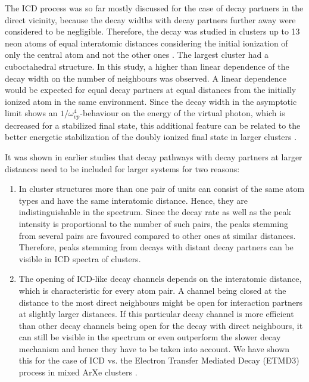 The ICD process was so far mostly discussed for the case of decay partners in
the direct vicinity, because the decay widths with decay partners further away
were considered to be negligible. Therefore, the decay was studied in clusters
up to 13 neon atoms of equal interatomic distances considering the initial
ionization of only the central
atom and not the other ones \cite{Santra01_3}. The largest cluster had
a cuboctahedral structure. In this study, a higher than
linear dependence of the decay width on the number of neighbours was
observed. A linear dependence would be expected for equal decay partners
at equal distances from the initially ionized atom in the same environment.
Since the decay width in the asymptotic limit shows an 
$1/\omega^{4}_{vp}$-behaviour on the energy of the virtual photon, which
is decreased for a stabilized final state, this additional feature
can be related to
the better energetic stabilization of the doubly ionized
final state in larger clusters \cite{Fasshauer13}.

It was shown in earlier studies \cite{Fasshauer13,Fasshauer14_1,Fasshauer16_1}
that decay pathways with decay partners at larger distances need to
be included for larger systems for two reasons:
\begin{enumerate}
 \item In cluster structures more than one pair of units can consist of
       the same atom types and have the same interatomic distance. Hence,
       they are indistinguishable in the spectrum. Since the decay rate
       as well as the peak intensity
       is proportional to the number of such pairs,
       the peaks stemming from several pairs are favoured
       compared to other ones at similar distances. Therefore, peaks
       stemming from decays with distant decay partners can be visible
       in ICD spectra of clusters. \cite{Fasshauer14_1}
 \item The opening of ICD-like decay channels depends on the interatomic
       distance, which is characteristic for every atom pair.
       A channel being closed at the distance to the most direct
       neighbours might be open for interaction partners at slightly
       larger distances. If this particular decay channel is more efficient
       than other decay channels being open for the decay with direct
       neighbours, it can still be visible in the spectrum or even
       outperform the slower decay mechanism and hence they have to be
       taken into account. We have shown this for the case of ICD vs.
       the Electron Transfer Mediated Decay (ETMD3) process in mixed ArXe
       clusters \cite{Fasshauer13,Fasshauer16_1}.
\end{enumerate}

